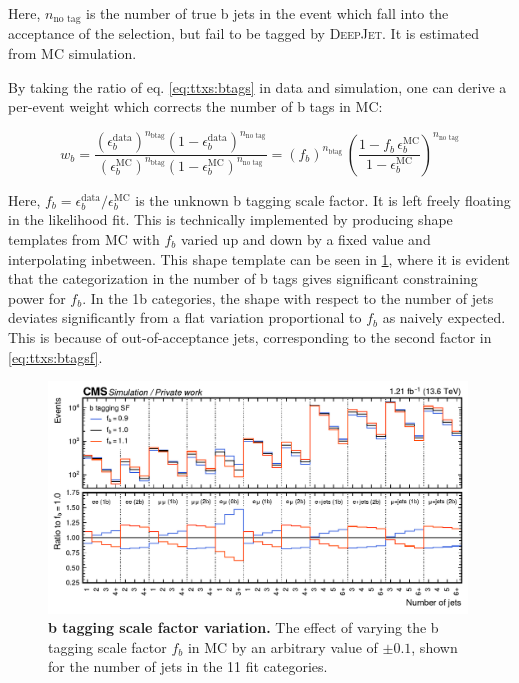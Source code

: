 Here, $n_{\text{no tag}}$ is the number of true b jets in the event which fall into the acceptance of the selection, but fail to be tagged by \textsc{DeepJet}. It is estimated from MC simulation. %

By taking the ratio of eq. \ref{eq:ttxs:btags} in data and simulation, one can derive a per-event weight which corrects the number of b tags in MC:

\begin{equation}
\label{eq:ttxs:btagsf}
    w_b = \frac
    {(\epsilon_b^{\mathrm{data}})^{n_{\mathrm{b tag}}} (1 - \epsilon_b^{\mathrm{data}})^{n_{\text{no tag}}}}
    {(\epsilon_b^{\mathrm{MC}})^{n_{\mathrm{b tag}}} (1 - \epsilon_b^{\mathrm{MC}})^{n_{\text{no tag}}}} 
    = (f_b)^{n_{\mathrm{b tag}}} \, \left( \frac{1 - f_b \, \epsilon_b^{\mathrm{MC}}}{1 - \epsilon_b^{\mathrm{MC}}} \right)^{n_{\text{no tag}}}
\end{equation}

Here, $f_b = \epsilon_b^{\mathrm{data}}/\epsilon_b^{\mathrm{MC}}$ is the unknown b tagging scale factor. It is left freely floating in the likelihood fit. This is technically implemented by producing shape templates from MC with $f_b$ varied up and down by a fixed value and interpolating inbetween. This shape template can be seen in \cref{fig:ttxs:btagsf}, where it is evident that the categorization in the number of b tags gives significant constraining power for $f_b$. In the 1b categories, the shape with respect to the number of jets deviates significantly from a flat variation proportional to $f_b$ as naively expected. This is because of out-of-acceptance jets, corresponding to the second factor in \cref{eq:ttxs:btagsf}.

\begin{figure}[ht]
    \centering
    \includegraphics[width=0.99\textwidth]{figures/ttxs/scalefactors/btagsf.pdf}
    \caption{
       \textbf{b tagging scale factor variation.} The effect of varying the b tagging scale factor $f_b$ in \ttbar MC by an arbitrary value of $\pm 0.1$, shown for the number of jets in the 11 fit categories.
    }
    \label{fig:ttxs:btagsf}
\end{figure}

